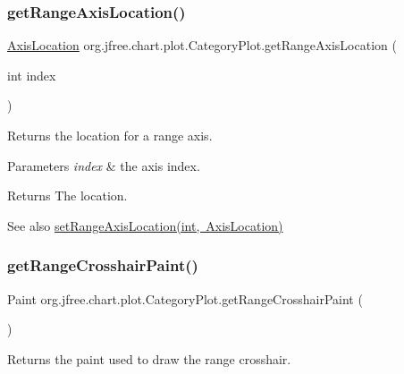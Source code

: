 \subsubsection{\texorpdfstring{get\+Range\+Axis\+Location()}{getRangeAxisLocation()}\hspace{0.1cm}{\footnotesize\ttfamily [2/2]}}
{\footnotesize\ttfamily \mbox{\hyperlink{classorg_1_1jfree_1_1chart_1_1axis_1_1_axis_location}{Axis\+Location}} org.\+jfree.\+chart.\+plot.\+Category\+Plot.\+get\+Range\+Axis\+Location (\begin{DoxyParamCaption}\item[{int}]{index }\end{DoxyParamCaption})}

Returns the location for a range axis.


\begin{DoxyParams}{Parameters}
{\em index} & the axis index.\\
\hline
\end{DoxyParams}
\begin{DoxyReturn}{Returns}
The location.
\end{DoxyReturn}
\begin{DoxySeeAlso}{See also}
\mbox{\hyperlink{classorg_1_1jfree_1_1chart_1_1plot_1_1_category_plot_a242adbc02f7e5b651062dbddfcfd9765}{set\+Range\+Axis\+Location(int, Axis\+Location)}} 
\end{DoxySeeAlso}
\mbox{\label{classorg_1_1jfree_1_1chart_1_1plot_1_1_category_plot_a765b9210a12e1f9374c252a5736a659a}} 
\subsubsection{\texorpdfstring{get\+Range\+Crosshair\+Paint()}{getRangeCrosshairPaint()}}
{\footnotesize\ttfamily Paint org.\+jfree.\+chart.\+plot.\+Category\+Plot.\+get\+Range\+Crosshair\+Paint (\begin{DoxyParamCaption}{ }\end{DoxyParamCaption})}

Returns the paint used to draw the range crosshair.

